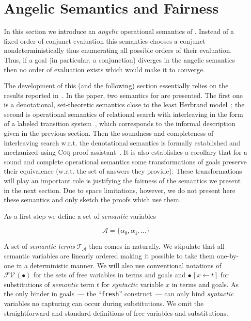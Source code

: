 \section{Angelic Semantics and Fairness}
\label{sec:angelic-semantics}

In this section we introduce an \emph{angelic} operational semantics of \mk. Instead of a fixed order of conjunct evaluation this semantics chooses a conjunct nondeterministically
thus enumerating all possible orders of their evaluation. Thus, if a goal (in particular, a conjunction) diverges in the angelic semantics then no order of evaluation exists which
would make it to converge.

The development of this (and the following) section essentially relies on the results reported in~\cite{fair:semantics}. In the paper, two semantics for \mk are presented. The first one is
a denotational, set-theoretic semantics close to the least Herbrand model~\cite{Lloyd}; the second is operational semantics of relational search with interleaving in the form of a labeled transition
system~\cite{LTS}, which corresponds to the informal description given in the previous section. Then the soundness and completeness of interleaving search w.r.t. the denotational semantics
is formally established and mechanized using \textsc{Coq} proof assistant~\cite{Coq}. It is also establishes a corollary that for a sound and complete operational semantics some
transformations of goals preserve their equivalence (w.r.t. the set of answers they provide). These transformations will play an important role is justifying the fairness of the semantics we present
in the next section. Due to space limitations, however, we do not present here these semantics and only sketch the proofs which use them.
 
As a first step we define a set of \emph{semantic} variables

\[
\mathcal{A}=\{\alpha_0,\alpha_1,\dots\}
\]

A set of \emph{semantic terms} $\mathcal{T}_{\mathcal A}$ then comes in naturally. We stipulate that all semantic variables are linearly ordered making it possible to take them one-by-one
in a deterministic manner. We will also use conventional notations of $\mathcal{FV}\,(\bullet)$ for the sets of free variables in terms and goals and $\bullet\,[x\gets t]$ for substitutions
of \emph{semantic} term $t$ for \emph{syntactic} variable $x$ in terms and goals. As the only binder in goals~--- the ``\lstinline|fresh|'' construct~--- can only bind \emph{syntactic}
variables no capturing can occur during substitutions. We omit the straightforward and standard definitions of free variables and substitutions.


